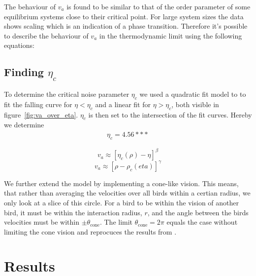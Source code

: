 \documentclass[twoside,twocolumn]{article}
\begin{document}
The behaviour of $v_a$ is found to be similar to that of the order parameter of some equilibrium systems close to their critical point. For large system sizes the data shows scaling which is an indication of a phase transition. Therefore it's possible to describe the behaviour of $v_a$ in the thermodynamic limit using the following equations:




\subsection{Finding $\eta_c$}
To determine the critical noise parameter $\eta_c$ we used a quadratic fit model
to to fit the falling curve for $\eta < \eta_c$ and a linear fit for $\eta > 
\eta_c$, both visible in figure~\ref{fig:va_over_eta}. $\eta_c$ is then set to 
the intersection of the fit curves. Hereby we determine
\begin{align}
\eta_c = 4.56***
\end{align}





\begin{equation}
  \label{eq:va-eta}
  v_a \approx[\eta_c(\rho)-\eta]^\beta 
\end{equation}
\begin{equation}
  \label{eq:va-rho}
  v_a \approx[\rho-\rho_c(eta)]^\gamma
\end{equation}

We further extend the model by implementing a cone-like vision. This means, that 
rather than averaging the velocities over all birds within a certian radius, we 
only look at a slice of this circle. For a bird to be within the vision of 
another bird, it must be within the interaction radius, $r$, and the angle 
between the birds velocities must be within $\pm \theta_{\text{cone}}$. The 
limit $\theta_{\text{cone}} = 2\pi$ equals the case without limiting the
cone vision and reprocuces the results from \cite{Vicsek}.


\section{Results}
\end{document}
